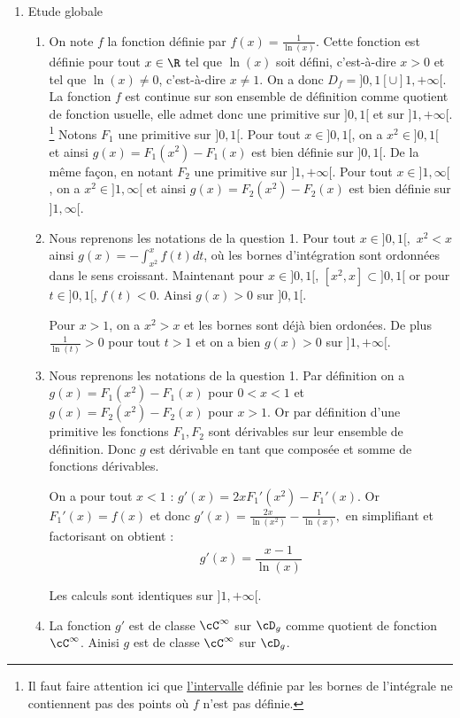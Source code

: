 
\begin{correction}
\begin{enumerate}
\item Etude globale
\begin{enumerate}
\item On note $f$ la fonction définie par $f(x)=\frac{1}{\ln(x)}$.
Cette fonction est définie pour tout $x\in \R$ tel que $\ln(x)$ soit défini, c'est-à-dire $x>0$ et tel que $\ln(x)\neq0$, c'est-à-dire $x\neq 1$. On a donc $D_f =  ]0,1[\cup ]1,+\infty[$. 
La fonction $f$ est continue  sur son ensemble de définition comme quotient de fonction usuelle, elle admet donc une primitive sur $]0,1[$ et sur $]1,+\infty[$. \footnote{Il faut faire attention ici que \underline{l'intervalle} définie par les bornes de l'intégrale ne contiennent pas des points où $f$ n'est pas définie. } Notons $F_1$ une primitive sur $]0,1[$. Pour tout $x\in ]0,1[$, on a $x^2\in ]0,1[$ et ainsi $g(x)=F_1(x^2)-F_1(x)$ est bien définie sur $]0,1[$. 
De la même façon, en notant $F_2$ une primitive sur $]1,+\infty[$. Pour tout $x\in ]1,\infty[$, on a $x^2\in ]1,\infty[$ et ainsi $g(x)=F_2(x^2)-F_2(x)$ est bien définie sur $]1,\infty[$. 

\item 
Nous reprenons les notations de la question 1. Pour tout $x\in ]0,1[, $ $x^2<x$ ainsi $g(x) = -\int_{x^2}^x f(t)dt$, où les bornes d'intégration sont ordonnées dans le sens croissant. Maintenant pour $x\in ]0,1[$,  $[x^2,x] \subset ]0,1[$ or pour $t\in ]0,1[$, $f(t) < 0$. Ainsi $g(x)>0$ sur $]0,1[$. 

Pour $x>1$, on a $x^2>x$ et les bornes sont déjà bien ordonées. De plus $\frac{1}{\ln(t)}>0$ pour tout $t>1$ et on a bien $g(x)>0$ sur $]1,+\infty[$. 

\item Nous reprenons les notations de la question 1. Par définition on  a
$g(x) = F_1 (x^2) - F_1(x)$ pour $0<x<1$ et $g(x) = F_2 (x^2) - F_2(x)$ pour $x>1$. Or par définition d'une primitive les fonctions $F_1, F_2$ sont dérivables sur leur ensemble de définition. Donc $g$ est dérivable en tant que composée et somme de fonctions dérivables. 

On  a pour tout $x<1$ : $g'(x) = 2xF_1'(x^2) - F_1'(x)$. Or $F_1'(x) =f(x)$ et donc 
$g'(x) =\frac{2x}{\ln(x^2)}-\frac{1}{\ln(x)},  $ en simplifiant et factorisant on obtient : 
$$g'(x) = \frac{x-1}{\ln(x)}$$

Les calculs sont identiques sur $]1,+\infty[$. 

\item La fonction $g'$ est de classe $\cC^\infty$ sur $\cD_g$ comme quotient de fonction $\cC^\infty$. Ainisi $g$ est de classe $\cC^\infty$ sur $\cD_g$. 


\end{enumerate}
\end{enumerate}
\end{correction}
